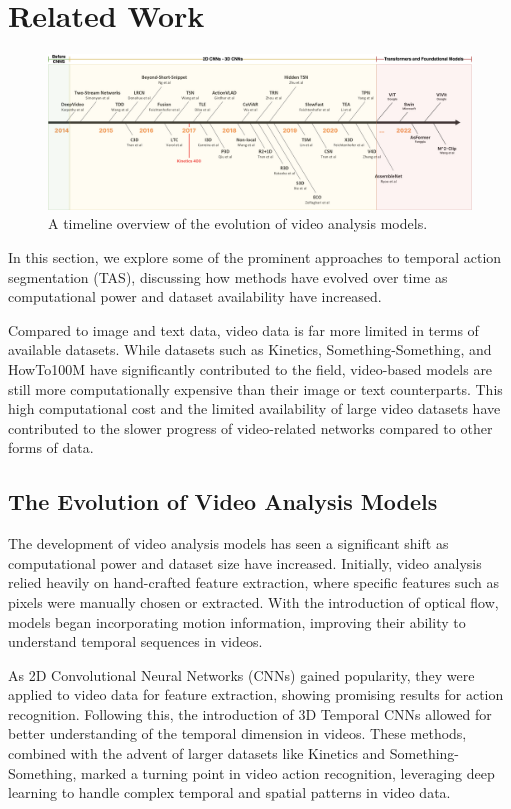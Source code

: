 \section{Related Work}

\begin{figure}[t]
    \centering
    \includegraphics[width=\textwidth]{../../assets/figures/extended-video-timeline-v3.png}
    \caption{A timeline overview of the evolution of video analysis models.}
    \label{fig:your-label}
\end{figure}

In this section, we explore some of the prominent approaches to temporal action segmentation (TAS), discussing how methods have evolved over time as computational power and dataset availability have increased.

Compared to image and text data, video data is far more limited in terms of available datasets. While datasets such as Kinetics, Something-Something, and HowTo100M have significantly contributed to the field, video-based models are still more computationally expensive than their image or text counterparts. This high computational cost and the limited availability of large video datasets have contributed to the slower progress of video-related networks compared to other forms of data.

\subsection{The Evolution of Video Analysis Models}

The development of video analysis models has seen a significant shift as computational power and dataset size have increased. Initially, video analysis relied heavily on hand-crafted feature extraction, where specific features such as pixels were manually chosen or extracted. With the introduction of optical flow, models began incorporating motion information, improving their ability to understand temporal sequences in videos.

As 2D Convolutional Neural Networks (CNNs) gained popularity, they were applied to video data for feature extraction, showing promising results for action recognition. Following this, the introduction of 3D Temporal CNNs allowed for better understanding of the temporal dimension in videos. These methods, combined with the advent of larger datasets like Kinetics and Something-Something, marked a turning point in video action recognition, leveraging deep learning to handle complex temporal and spatial patterns in video data.

